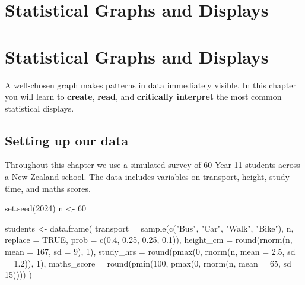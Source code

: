 \documentclass[
  11pt,
  a4paper,
  oneside,
  open=any]{scrbook}
\newenvironment{Shaded}{\begin{snugshade}}{\end{snugshade}}
\newcommand{\AttributeTok}[1]{\textcolor[rgb]{0.40,0.45,0.13}{#1}}
\newcommand{\ConstantTok}[1]{\textcolor[rgb]{0.56,0.35,0.01}{#1}}
\newcommand{\DecValTok}[1]{\textcolor[rgb]{0.68,0.00,0.00}{#1}}
\newcommand{\FloatTok}[1]{\textcolor[rgb]{0.68,0.00,0.00}{#1}}
\newcommand{\FunctionTok}[1]{\textcolor[rgb]{0.28,0.35,0.67}{#1}}
\newcommand{\NormalTok}[1]{\textcolor[rgb]{0.00,0.23,0.31}{#1}}
\newcommand{\OtherTok}[1]{\textcolor[rgb]{0.00,0.23,0.31}{#1}}
\newcommand{\StringTok}[1]{\textcolor[rgb]{0.13,0.47,0.30}{#1}}
\begin{document}

\chapter{Statistical Graphs and
Displays}\label{statistical-graphs-and-displays}


\chapter{Statistical Graphs and Displays}\label{sec-graphs}

A well-chosen graph makes patterns in data immediately visible. In this
chapter you will learn to \textbf{create}, \textbf{read}, and
\textbf{critically interpret} the most common statistical displays.

\section{Setting up our data}\label{setting-up-our-data}

Throughout this chapter we use a simulated survey of 60 Year 11 students
across a New Zealand school. The data includes variables on transport,
height, study time, and maths scores.

\begin{Shaded}
\begin{Highlighting}[]
\FunctionTok{set.seed}\NormalTok{(}\DecValTok{2024}\NormalTok{)}
\NormalTok{n }\OtherTok{\textless{}{-}} \DecValTok{60}

\NormalTok{students }\OtherTok{\textless{}{-}} \FunctionTok{data.frame}\NormalTok{(}
  \AttributeTok{transport  =} \FunctionTok{sample}\NormalTok{(}\FunctionTok{c}\NormalTok{(}\StringTok{"Bus"}\NormalTok{, }\StringTok{"Car"}\NormalTok{, }\StringTok{"Walk"}\NormalTok{, }\StringTok{"Bike"}\NormalTok{), n,}
                      \AttributeTok{replace =} \ConstantTok{TRUE}\NormalTok{, }\AttributeTok{prob =} \FunctionTok{c}\NormalTok{(}\FloatTok{0.4}\NormalTok{, }\FloatTok{0.25}\NormalTok{, }\FloatTok{0.25}\NormalTok{, }\FloatTok{0.1}\NormalTok{)),}
  \AttributeTok{height\_cm  =} \FunctionTok{round}\NormalTok{(}\FunctionTok{rnorm}\NormalTok{(n, }\AttributeTok{mean =} \DecValTok{167}\NormalTok{, }\AttributeTok{sd =} \DecValTok{9}\NormalTok{), }\DecValTok{1}\NormalTok{),}
  \AttributeTok{study\_hrs  =} \FunctionTok{round}\NormalTok{(}\FunctionTok{pmax}\NormalTok{(}\DecValTok{0}\NormalTok{, }\FunctionTok{rnorm}\NormalTok{(n, }\AttributeTok{mean =} \FloatTok{2.5}\NormalTok{, }\AttributeTok{sd =} \FloatTok{1.2}\NormalTok{)), }\DecValTok{1}\NormalTok{),}
  \AttributeTok{maths\_score =} \FunctionTok{round}\NormalTok{(}\FunctionTok{pmin}\NormalTok{(}\DecValTok{100}\NormalTok{, }\FunctionTok{pmax}\NormalTok{(}\DecValTok{0}\NormalTok{, }\FunctionTok{rnorm}\NormalTok{(n, }\AttributeTok{mean =} \DecValTok{65}\NormalTok{, }\AttributeTok{sd =} \DecValTok{15}\NormalTok{))))}
\NormalTok{)}
\end{Highlighting}
\end{Shaded}
\end{document}
